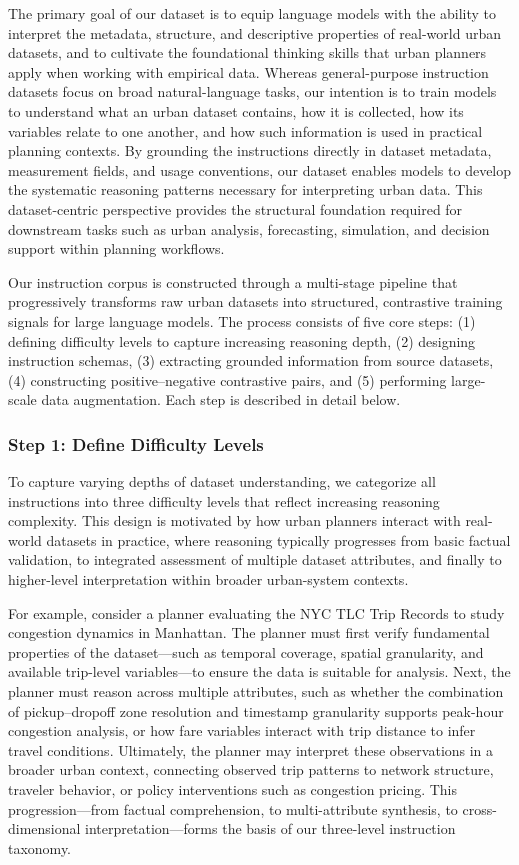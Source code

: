 \documentclass[a4paper,fleqn]{cas-sc}
\begin{document}
The primary goal of our dataset is to equip language models with the ability to interpret the metadata, structure, and descriptive properties of real-world urban datasets, and to cultivate the foundational thinking skills that urban planners apply when working with empirical data. Whereas general-purpose instruction datasets focus on broad natural-language tasks, our intention is to train models to understand what an urban dataset contains, how it is collected, how its variables relate to one another, and how such information is used in practical planning contexts. By grounding the instructions directly in dataset metadata, measurement fields, and usage conventions, our dataset enables models to develop the systematic reasoning patterns necessary for interpreting urban data. This dataset-centric perspective provides the structural foundation required for downstream tasks such as urban analysis, forecasting, simulation, and decision support within planning workflows.

Our instruction corpus is constructed through a multi-stage pipeline that progressively transforms raw urban datasets into structured, contrastive training signals for large language models. The process consists of five core steps:
(1) defining difficulty levels to capture increasing reasoning depth,
(2) designing instruction schemas,
(3) extracting grounded information from source datasets,
(4) constructing positive–negative contrastive pairs, and
(5) performing large-scale data augmentation.
Each step is described in detail below.

\subsubsection{Step 1: Define Difficulty Levels}

To capture varying depths of dataset understanding, we categorize all instructions into three difficulty levels that reflect increasing reasoning complexity. This design is motivated by how urban planners interact with real-world datasets in practice, where reasoning typically progresses from basic factual validation, to integrated assessment of multiple dataset attributes, and finally to higher-level interpretation within broader urban-system contexts.

For example, consider a planner evaluating the NYC TLC Trip Records to study congestion dynamics in Manhattan. The planner must first verify fundamental properties of the dataset—such as temporal coverage, spatial granularity, and available trip-level variables—to ensure the data is suitable for analysis. Next, the planner must reason across multiple attributes, such as whether the combination of pickup–dropoff zone resolution and timestamp granularity supports peak-hour congestion analysis, or how fare variables interact with trip distance to infer travel conditions. Ultimately, the planner may interpret these observations in a broader urban context, connecting observed trip patterns to network structure, traveler behavior, or policy interventions such as congestion pricing. This progression—from factual comprehension, to multi-attribute synthesis, to cross-dimensional interpretation—forms the basis of our three-level instruction taxonomy.
\end{document}
